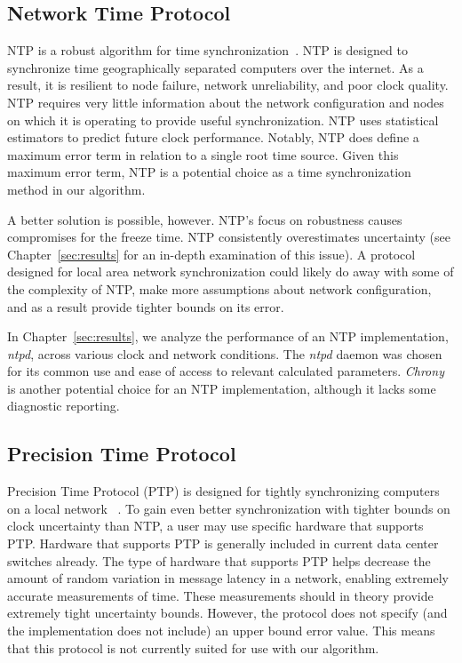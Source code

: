 \subsection{Network Time Protocol}

NTP is a robust algorithm for time
synchronization~\citep{Burbank2010}. NTP is designed to
synchronize time geographically separated computers over the internet. As a
result, it is resilient to node failure, network unreliability, and
poor clock quality. NTP requires very little information about the
network configuration and nodes on which it is operating to provide useful
synchronization. NTP uses statistical estimators to predict
future clock performance. Notably, NTP does define a maximum error
term in relation to a single root time source. Given this maximum error 
term, NTP is a potential choice as a time synchronization method in 
our algorithm.

A better solution is possible, however. NTP's focus on robustness
causes compromises for the freeze time. NTP consistently overestimates
uncertainty (see Chapter~\ref{sec:results} for an in-depth 
examination of this issue). A protocol designed for local area network
synchronization could likely do away with some of the complexity of
NTP, make more assumptions about network configuration, and as a
result provide tighter bounds on its error.

In Chapter~\ref{sec:results}, we analyze the
performance of an NTP implementation, \textit{ntpd}, across various clock and
network conditions. The \textit{ntpd} daemon was chosen for its common use and
ease of access to relevant calculated parameters. \textit{Chrony} is another
potential choice for an NTP implementation, although it lacks some
diagnostic reporting. %

\subsection{Precision Time Protocol}

Precision Time Protocol (PTP) is designed for 
tightly synchronizing computers on a local network
~\citeyearpar{2008}. To gain even better 
synchronization with tighter bounds on clock uncertainty than NTP, 
a user may use specific hardware that supports PTP. Hardware that supports
PTP is generally included in current data center switches already. The type
of hardware that supports PTP helps decrease the amount of random variation in
message latency in a network, enabling extremely accurate measurements of time.
These measurements should in theory provide extremely tight uncertainty
bounds. However, the protocol does not specify (and the implementation
does not include) an upper bound error value. This means that this
protocol is not currently suited for use with our algorithm.

